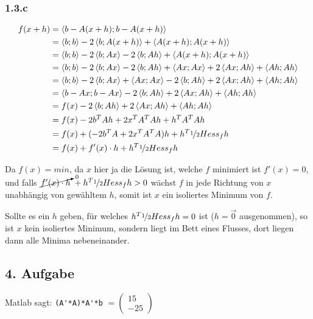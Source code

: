 \subsubsection*{1.3.c}
\begin{equation}\begin{split}
	f(x+h) &= \left\langle b-A(x+h);b-A(x+h)\right\rangle\\
	&= \left\langle b;b\right\rangle -2\left\langle b;A(x+h)\right\rangle + \left\langle A(x+h);A(x+h)\right\rangle\\
	&= \left\langle b;b\right\rangle -2\left\langle b;Ax\right\rangle -2\left\langle b;Ah\right\rangle + \left\langle A(x+h);A(x+h)\right\rangle\\
	&= \left\langle b;b\right\rangle -2\left\langle b;Ax\right\rangle -2\left\langle b;Ah\right\rangle + \left\langle Ax;Ax\right\rangle + 2\left\langle Ax;Ah\right\rangle + \left\langle Ah;Ah\right\rangle \\
	&= \left\langle b;b\right\rangle -2\left\langle b;Ax\right\rangle + \left\langle Ax;Ax\right\rangle -2\left\langle b;Ah\right\rangle + 2\left\langle Ax;Ah\right\rangle + \left\langle Ah;Ah\right\rangle \\
	&= \left\langle b -Ax;b -Ax\right\rangle -2\left\langle b;Ah\right\rangle + 2\left\langle Ax;Ah\right\rangle + \left\langle Ah;Ah\right\rangle \\
	&= f(x) -2\left\langle b;Ah\right\rangle + 2\left\langle Ax;Ah\right\rangle + \left\langle Ah;Ah\right\rangle \\
	&= f(x) -2b^TAh + 2x^TA^TAh + h^TA^TAh \\
	&= f(x) +(-2b^TA + 2x^TA^TA)h + h^T\nicefrac{1}{2}Hess_fh \\
	&= f(x) +f'(x)\cdot h + h^T\nicefrac{1}{2}Hess_fh \\
\end{split}\end{equation}

Da $f(x) = min$, da $x$ hier ja die Lösung ist, welche $f$ minimiert ist $f'(x)=0$, und falls $\cancelto{0}{f'(x)\cdot h}\; + h^T\nicefrac{1}{2}Hess_fh > 0$ wächst $f$ in jede Richtung von $x$ unabhängig von gewähltem $h$, somit ist $x$ ein isoliertes Minimum von $f$.

Sollte es ein $h$ geben, für welches $h^T\nicefrac{1}{2}Hess_fh = 0$ ist ($h = \vec{0}$ ausgenommen), so ist $x$ kein isoliertes Minimum, sondern liegt im \glqq Bett eines Flusses\dq, dort liegen dann alle Minima nebeneinander.


\subsection*{4. Aufgabe}
Matlab sagt:
\lstinline{(A'*A)*A'*b} \quad$ = \begin{pmatrix*}15\\-25\end{pmatrix*}$


